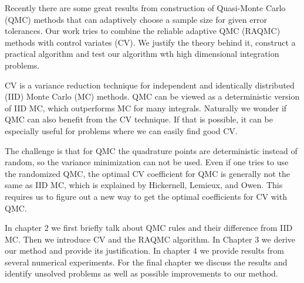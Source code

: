 

Recently there are some great results from construction of Quasi-Monte Carlo (QMC) methods that can adaptively choose a sample size for given error tolerances\cite{hickernell2014reliable}.   
Our work tries to combine the reliable adaptive QMC (RAQMC) methods with control variates (CV). 
We justify the theory behind it, construct a practical algorithm and test our algorithm wth high dimensional integration problems.

CV is a variance reduction technique for independent and identically distributed (IID) Monte Carlo (MC) methods.
QMC can be viewed as a deterministic version of IID MC, which outperforms MC for many integrals\cite{avramidis1996integrated}. 
Naturally we wonder if QMC can also benefit from the CV technique. If that is possible, it can be especially useful for problems where we can easily find good CV.


The challenge is that for QMC the quadrature points are deterministic instead of random, so the variance minimization can not be used. 
Even if one tries to use the randomized QMC, the optimal CV coefficient for QMC is generally not the same as IID MC, which is explained by Hickernell, Lemieux, and Owen\cite{hickernell2005control}. 
This requires us to figure out a new way to get the optimal coefficients for CV with QMC.


In chapter 2 we first briefly talk about QMC rules and their difference from IID MC. 
Then we introduce CV and the RAQMC algorithm. 
In Chapter 3 we derive our method and provide its justification.
In chapter 4 we provide results from several numerical experiments. 
For the final chapter we discuss the results and identify unsolved problems as well as possible improvements to our method.
